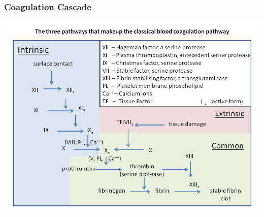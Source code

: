 \begin{frame}\frametitle{Coagulation Cascade}
\includegraphics[scale=.4]{./coag-cascade}
\end{frame}

